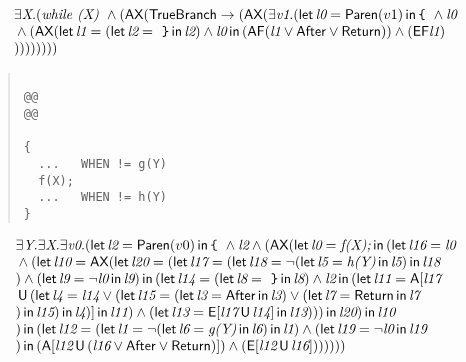 \documentclass{article}
\newcommand{\U}{\,\mbox{\sf{U}}\,}
\newcommand{\A}{\mbox{\sf{A}}}
\newcommand{\E}{\mbox{\sf{E}}}
\newcommand{\AX}{\mbox{\sf{AX}}}
\newcommand{\AF}{\mbox{\sf{AF}}}
\newcommand{\EF}{\mbox{\sf{EF}}}
\newcommand{\mita}[1]{\mbox{\it{{#1}}}}
\newcommand{\msf}[1]{\mbox{\sf{{#1}}}}
\newcommand{\ttlb}{\mbox{\tt \char'173}}
\newcommand{\ttrb}{\mbox{\tt \char'175}}
\begin{document}
\[\begin{array}{l}
\exists \mita{X} . (\mita{while (X) } \wedge (\AX(\msf{TrueBranch} \rightarrow (\AX(\exists \mita{v1} . (\mita{\sf{let}} \, \mita{l0} = \msf{Paren}(v1) \, \mita{\sf{in}} \, \mita{{\ttlb}
  } \wedge \mita{l0}\\\mbox{} \wedge (\AX(\mita{\sf{let}} \, \mita{l1} = (\mita{\sf{let}} \, \mita{l2} = \mita{
{\ttrb}} \, \mita{\sf{in}} \, \mita{l2}
) \wedge \mita{l0} \, \mita{\sf{in}} \, (\AF(\mita{l1} \vee \msf{After} \vee \msf{Return})) \wedge (\EF\mita{l1})\\\mbox{}
))
))))))
\end{array}\]

\begin{quote}\begin{verbatim}

@@
@@

{
  ...   WHEN != g(Y)
  f(X);
  ...   WHEN != h(Y)
}
\end{verbatim}\end{quote}

\[\begin{array}{l}
\exists \mita{Y} . \exists \mita{X} . \exists \mita{v0} . (\mita{\sf{let}} \, \mita{l2} = \msf{Paren}(v0) \, \mita{\sf{in}} \, \mita{{\ttlb}
  } \wedge \mita{l2} \wedge (\AX(\mita{\sf{let}} \, \mita{l0} = \mita{f(X);} \, \mita{\sf{in}} \, (\mita{\sf{let}} \, \mita{l16} = \mita{l0}\\\mbox{} \wedge (\mita{\sf{let}} \, \mita{l10} = \AX(\mita{\sf{let}} \, \mita{l20} = (\mita{\sf{let}} \, \mita{l17} = (\mita{\sf{let}} \, \mita{l18} = \neg (\mita{\sf{let}} \, \mita{l5} = \mita{h(Y)} \, \mita{\sf{in}} \, \mita{l5}
) \, \mita{\sf{in}} \, \mita{l18}\\\mbox{}
) \wedge (\mita{\sf{let}} \, \mita{l9} = \neg \mita{l0} \, \mita{\sf{in}} \, \mita{l9}
) \, \mita{\sf{in}} \, (\mita{\sf{let}} \, \mita{l14} = (\mita{\sf{let}} \, \mita{l8} = \mita{
{\ttrb}} \, \mita{\sf{in}} \, \mita{l8}
) \wedge \mita{l2} \, \mita{\sf{in}} \, (\mita{\sf{let}} \, \mita{l11} = \A[\mita{l17}\\\mbox{} \U (\mita{\sf{let}} \, \mita{l4} = \mita{l14} \vee (\mita{\sf{let}} \, \mita{l15} = (\mita{\sf{let}} \, \mita{l3} = \msf{After} \, \mita{\sf{in}} \, \mita{l3}
) \vee (\mita{\sf{let}} \, \mita{l7} = \msf{Return} \, \mita{\sf{in}} \, \mita{l7}\\\mbox{}
) \, \mita{\sf{in}} \, \mita{l15}
) \, \mita{\sf{in}} \, \mita{l4}
)]
 \, \mita{\sf{in}} \, \mita{l11}
) \wedge (\mita{\sf{let}} \, \mita{l13} = \E[\mita{l17} \U \mita{l14}]
 \, \mita{\sf{in}} \, \mita{l13}
)
)
) \, \mita{\sf{in}} \, \mita{l20}
) \, \mita{\sf{in}} \, \mita{l10}\\\mbox{}
) \, \mita{\sf{in}} \, (\mita{\sf{let}} \, \mita{l12} = (\mita{\sf{let}} \, \mita{l1} = \neg (\mita{\sf{let}} \, \mita{l6} = \mita{g(Y)} \, \mita{\sf{in}} \, \mita{l6}
) \, \mita{\sf{in}} \, \mita{l1}
) \wedge (\mita{\sf{let}} \, \mita{l19} = \neg \mita{l0} \, \mita{\sf{in}} \, \mita{l19}\\\mbox{}
) \, \mita{\sf{in}} \, (\A[\mita{l12} \U (\mita{l16} \vee \msf{After} \vee \msf{Return})]
) \wedge (\E[\mita{l12} \U \mita{l16}]
)
)
)
))
)
\end{array}\]
\end{document}
